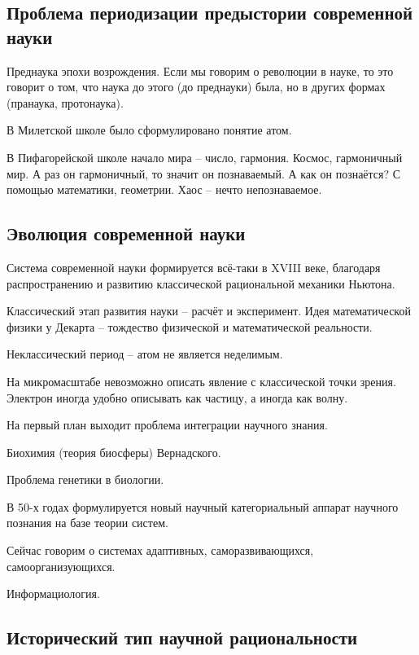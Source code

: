 \documentclass[main.tex]{subfiles}
\begin{document}
\subsection{Проблема периодизации предыстории современной науки}


Преднаука эпохи возрождения.
Если мы говорим о революции в науке, то это говорит о том, что наука до этого (до преднауки) была, но в других формах (пранаука, протонаука).

В Милетской школе было сформулировано понятие атом.

В Пифагорейской школе начало мира -- число, гармония.
Космос, гармоничный мир.
А раз он гармоничный, то значит он познаваемый.
А как он познаётся?
С помощью математики, геометрии.
Хаос -- нечто непознаваемое.

\subsection{Эволюция современной науки}


Система современной науки формируется всё-таки в XVIII веке, благодаря распространению и развитию классической рациональной механики Ньютона.

Классический этап развития науки -- расчёт и эксперимент.
Идея математической физики у Декарта -- тождество физической и математической реальности.

Неклассический период -- атом не является неделимым.

На микромасштабе невозможно описать явление с классической точки зрения.
Электрон иногда удобно описывать как частицу, а иногда как волну.


На первый план выходит проблема интеграции научного знания.

Биохимия (теория биосферы) Вернадского.

Проблема генетики в биологии.

В 50-х годах формулируется новый научный категориальный аппарат научного познания на базе теории систем.

Сейчас говорим о системах адаптивных, саморазвивающихся, самоорганизующихся.

Информациология.

\subsection{Исторический тип научной рациональности}
\end{document}
